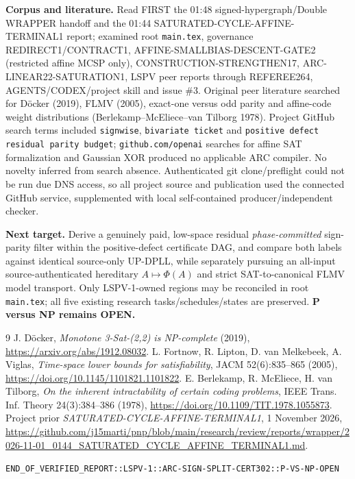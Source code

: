 \documentclass[11pt]{article}
\begin{document}
\noindent\textbf{Corpus and literature.} Read FIRST the 01:48 signed-hypergraph/Double WRAPPER handoff and the 01:44 SATURATED-CYCLE-AFFINE-TERMINAL1 report; examined root \texttt{main.tex}, governance REDIRECT1/CONTRACT1, AFFINE-SMALLBIAS-DESCENT-GATE2 (restricted affine MCSP only), CONSTRUCTION-STRENGTHEN17, ARC-LINEAR22-SATURATION1, LSPV peer reports through REFEREE264, AGENTS/CODEX/project skill and issue \#3. Original peer literature searched for D\"ocker (2019), FLMV (2005), exact-one versus odd parity and affine-code weight distributions (Berlekamp--McEliece--van Tilborg 1978). Project GitHub search terms included \texttt{signwise}, \texttt{bivariate ticket} and \texttt{positive defect residual parity budget}; \texttt{github.com/openai} searches for affine SAT formalization and Gaussian XOR produced no applicable ARC compiler. No novelty inferred from search absence. Authenticated git clone/preflight could not be run due DNS access, so all project source and publication used the connected GitHub service, supplemented with local self-contained producer/independent checker.

\noindent\textbf{Next target.} Derive a genuinely paid, low-space residual \emph{phase-committed} sign-parity filter within the positive-defect certificate DAG, and compare both labels against identical source-only UP-DPLL, while separately pursuing an all-input source-authenticated hereditary $A\mapsto\Phi(A)$ and strict SAT-to-canonical FLMV model transport. Only LSPV-1-owned regions may be reconciled in root \texttt{main.tex}; all five existing research tasks/schedules/states are preserved. \textbf{P versus NP remains OPEN.}

\begin{thebibliography}{9}
 J. D\"ocker, \emph{Monotone 3-Sat-(2,2) is NP-complete} (2019), \url{https://arxiv.org/abs/1912.08032}.
 L. Fortnow, R. Lipton, D. van Melkebeek, A. Viglas, \emph{Time-space lower bounds for satisfiability}, JACM 52(6):835--865 (2005), \url{https://doi.org/10.1145/1101821.1101822}.
 E. Berlekamp, R. McEliece, H. van Tilborg, \emph{On the inherent intractability of certain coding problems}, IEEE Trans. Inf. Theory 24(3):384--386 (1978), \url{https://doi.org/10.1109/TIT.1978.1055873}.
 Project prior \emph{SATURATED-CYCLE-AFFINE-TERMINAL1}, 1 November 2026, \url{https://github.com/j15marti/pnp/blob/main/research/review/reports/wrapper/2026-11-01_0144_SATURATED_CYCLE_AFFINE_TERMINAL1.md}.
\end{thebibliography}
\noindent\texttt{END\_OF\_VERIFIED\_REPORT::LSPV-1::ARC-SIGN-SPLIT-CERT302::P-VS-NP-OPEN}
\end{document}
